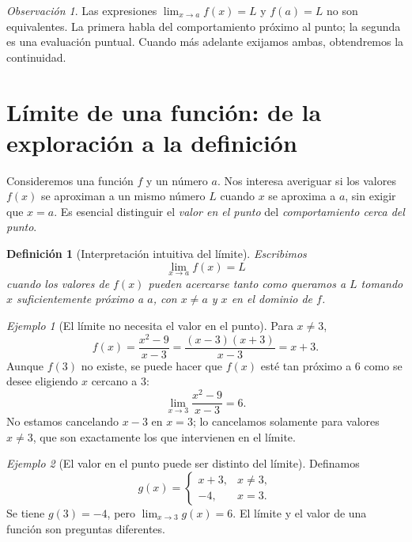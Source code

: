 \documentclass[12pt]{article}
\newtheorem{definicion}{Definición}[section]
\theoremstyle{remark}
\newtheorem{observacion}{Observación}
\newtheorem{ejemplo}{Ejemplo}
\begin{document}
\begin{observacion}
Las expresiones $\lim_{x\to a}f(x)=L$ y $f(a)=L$ no son equivalentes. La primera habla del comportamiento próximo al punto; la segunda es una evaluación puntual. Cuando más adelante exijamos ambas, obtendremos la continuidad.
\end{observacion}

\section{Límite de una función: de la exploración a la definición}
Consideremos una función $f$ y un número $a$. Nos interesa averiguar si los valores $f(x)$ se aproximan a un mismo número $L$ cuando $x$ se aproxima a $a$, sin exigir que $x=a$. Es esencial distinguir el \emph{valor en el punto} del \emph{comportamiento cerca del punto}.

\begin{definicion}[Interpretación intuitiva del límite]
Escribimos
\[
 \lim_{x\to a}f(x)=L
\]
cuando los valores de $f(x)$ pueden acercarse tanto como queramos a $L$ tomando $x$ suficientemente próximo a $a$, con $x\ne a$ y $x$ en el dominio de $f$.
\end{definicion}

\begin{ejemplo}[El límite no necesita el valor en el punto]
Para $x\ne3$,
\[
 f(x)=\frac{x^2-9}{x-3}=\frac{(x-3)(x+3)}{x-3}=x+3.
\]
Aunque $f(3)$ no existe, se puede hacer que $f(x)$ esté tan próximo a $6$ como se desee eligiendo $x$ cercano a $3$:
\[
 \boxed{\lim_{x\to3}\frac{x^2-9}{x-3}=6.}
\]
No estamos cancelando $x-3$ en $x=3$; lo cancelamos solamente para valores $x\ne3$, que son exactamente los que intervienen en el límite.
\end{ejemplo}

\begin{ejemplo}[El valor en el punto puede ser distinto del límite]
Definamos
\[
 g(x)=\begin{cases}x+3,&x\ne3,\\-4,&x=3.\end{cases}
\]
Se tiene $g(3)=-4$, pero $\lim_{x\to3}g(x)=6$. El límite y el valor de una función son preguntas diferentes.
\end{ejemplo}

\begin{center}
\end{center}
\end{document}
